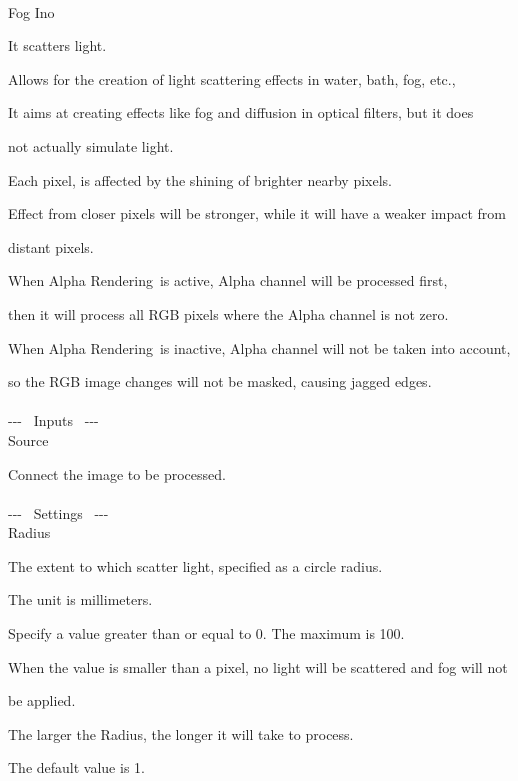\documentclass[a4paper,12pt]{article}
\begin{document}
\thispagestyle{empty}

\Large
\noindent \\
Fog Ino\medskip
\par
\normalsize
It scatters light.\par
Allows for the creation of light scattering effects in water, bath, fog, etc.,\par
It aims at creating effects like fog and diffusion in optical filters, but it does\par 
not actually simulate light.\\
\par
Each pixel, is affected by the shining of brighter nearby pixels.\par
Effect from closer pixels will be stronger, while it will have a weaker impact from\par 
distant pixels.\\
\par
When \textquotedbl Alpha Rendering\textquotedbl \ is active, Alpha channel will be processed first,\par
then it will process all RGB pixels where the Alpha channel is not zero.\\
\par
When \textquotedbl Alpha Rendering\textquotedbl \ is inactive, Alpha channel will not be taken into account,\par
so the RGB image changes will not be masked, causing jagged edges.\\
\\
-{-}- \ Inputs \ -{-}-\\
Source\par
Connect the image to be processed.\\
\\
-{-}- \ Settings \ -{-}-\\
Radius\par
The extent to which scatter light, specified as a circle radius.\par
The unit is millimeters.\par
Specify a value greater than or equal to 0. The maximum is 100.\par
When the value is smaller than a pixel, no light will be scattered and fog will not\par 
be applied.\par
The larger the Radius, the longer it will take to process.\par
The default value is 1.\\
\\
\end{document}
